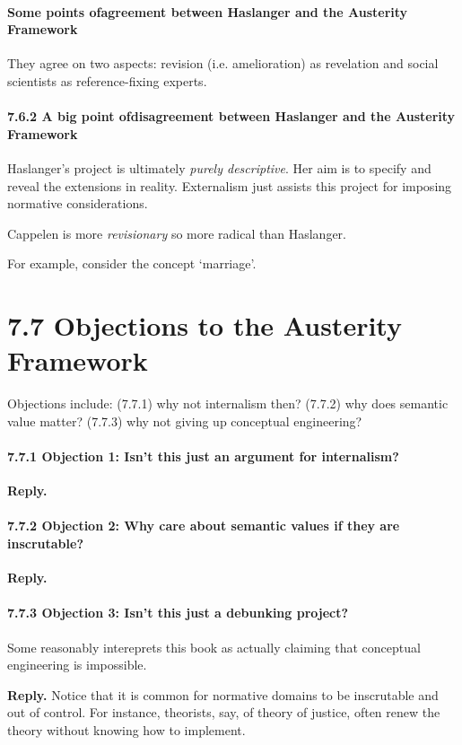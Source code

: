 \documentclass[
10pt, %
a4paper, %
twocolumn, %
landscape %
]{article}
\begin{document}
\paragraph{Some points ofagreement between Haslanger and the Austerity Framework}
They agree on two aspects: revision (i.e. amelioration) as revelation and social scientists as reference-fixing experts.

\paragraph{7.6.2 A big point ofdisagreement between Haslanger and the Austerity Framework}
Haslanger's project is ultimately \emph{purely descriptive}. Her aim is to specify and reveal the extensions in reality. Externalism just assists this project for imposing normative considerations.

Cappelen is more \emph{revisionary} so more radical than Haslanger.

For example, consider the concept `marriage'.

\section*{7.7 Objections to the Austerity Framework}
 Objections include: (7.7.1) why not internalism then? (7.7.2) why does semantic value matter? (7.7.3) why not giving up conceptual engineering?

\paragraph{7.7.1 Objection 1: Isn't this just an argument for internalism?}

\noindent \textbf{Reply.}

\paragraph{7.7.2 Objection 2: Why care about semantic values if they are inscrutable?}

\noindent \textbf{Reply.}

\paragraph{7.7.3 Objection 3: Isn't this just a debunking project?}
Some reasonably intereprets this book as actually claiming that conceptual engineering is impossible.

\noindent \textbf{Reply.} Notice that it is common for normative domains to be inscrutable and out of control. For instance, theorists, say, of theory of justice, often renew the theory without knowing how to implement.
\end{document}

